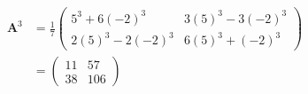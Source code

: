 \documentclass{article}
\begin{document}
\begin{align*}
  \mathbf{A}^3                           & = \frac{1}{7} \begin{pmatrix}
                                                           5^3 + 6 (-2)^3     & 3 (5)^3 - 3 (-2)^3 \\
                                                           2 (5)^3 - 2 (-2)^3 & 6 (5)^3 + (-2)^3
                                                         \end{pmatrix} \\
                                         & = \begin{pmatrix}
                                               11 & 57  \\
                                               38 & 106
                                             \end{pmatrix}
\end{align*}

\setcounter{subsubsection}{4}
\subsubsection{}
\end{document}
